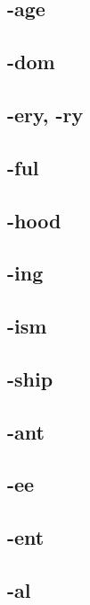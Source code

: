 \subsection{-age}

\subsection{-dom}

\subsection{-ery, -ry}

\subsection{-ful}

\subsection{-hood}

\subsection{-ing}

\subsection{-ism}

\subsection{-ship}

\subsection{-ant}

\subsection{-ee}

\subsection{-ent}

\subsection{-al}

